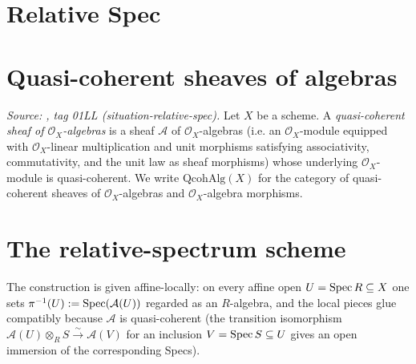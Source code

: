 \section{Relative Spec}
\label{mk-chap:Picard_RelativeSpec}

\section{Quasi-coherent sheaves of algebras}
\label{mk-sec:qc_sheaf_of_algebras}

\begin{definition}
  \label{mk-def:qc_sheaf_of_algebras}
  \textit{Source: \cite{stacks-project}, tag 01LL (situation-relative-spec).}
  Let \(X\) be a scheme. A \emph{quasi-coherent sheaf of \(\mathcal{O}_X\)-algebras} is a
  sheaf \(\mathcal{A}\) of \(\mathcal{O}_X\)-algebras (i.e. an \(\mathcal{O}_X\)-module
  equipped with \(\mathcal{O}_X\)-linear multiplication and unit morphisms satisfying
  associativity, commutativity, and the unit law as sheaf morphisms) whose underlying
  \(\mathcal{O}_X\)-module is quasi-coherent. We write \(\mathrm{QcohAlg}(X)\) for the
  category of quasi-coherent sheaves of \(\mathcal{O}_X\)-algebras and
  \(\mathcal{O}_X\)-algebra morphisms.
\end{definition}

\section{The relative-spectrum scheme}
\label{mk-sec:relspec_scheme}

The construction is given affine-locally: on every affine open \(U = \operatorname{Spec} R \subseteq X\) one
sets \(\pi^{-1}(U) := \operatorname{Spec}(\mathcal{A}(U))\) regarded as an \(R\)-algebra, and the local pieces
glue compatibly because \(\mathcal{A}\) is quasi-coherent (the transition isomorphism
\(\mathcal{A}(U) \otimes_R S \xrightarrow{\sim} \mathcal{A}(V)\) for an inclusion
\(V = \operatorname{Spec} S \subseteq U\) gives an open immersion of the corresponding Specs).

